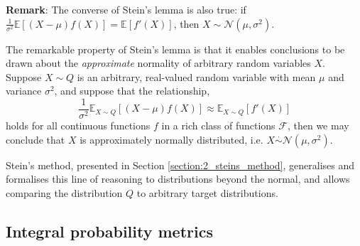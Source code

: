 \textbf{Remark}: The converse of Stein's lemma is also true: if $\frac{1}{\sigma^2}\mathbb{E}\left[(X - \mu)f(X) \right] = \mathbb{E}\left[f'(X) \right]$, then $X \sim \mathcal{N}(\mu, \sigma^2)$.

The remarkable property of Stein's lemma is that it enables conclusions to be drawn about the \textit{approximate} normality of arbitrary random variables $X$. Suppose $X \sim Q$ is an arbitrary, real-valued random variable with mean $\mu$ and variance $\sigma^2$, and suppose that the relationship, $$\frac{1}{\sigma^2}\mathbb{E}_{X \sim Q}\left[(X - \mu)f(X) \right] \approx \mathbb{E}_{X \sim Q}\left[f'(X) \right]$$ holds for all continuous functions $f$ in a rich class of functions $\mathcal{F}$, then we may conclude that $X$ is approximately normally distributed, i.e. $X \overset{\cdot}{\sim} \mathcal{N}(\mu, \sigma^2)$.

Stein's method, presented in Section \ref{section:2_steins_method}, generalises and formalises this line of reasoning to distributions beyond the normal, and allows comparing the distribution $Q$ to arbitrary target distributions.


\subsection{Integral probability metrics}

